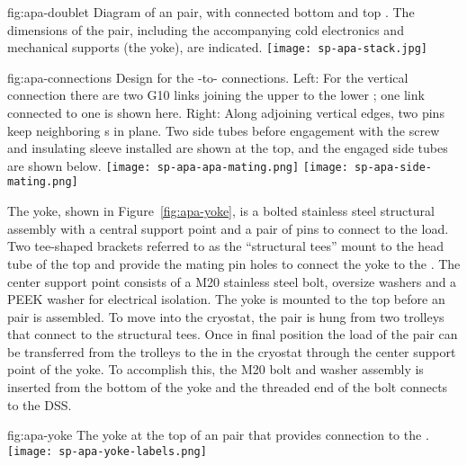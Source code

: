 \begin{dunefigure}{fig:apa-doublet}
{Diagram of an  pair, with connected bottom and top . The dimensions of the  pair, including the accompanying cold electronics and mechanical supports (the yoke), are indicated.}
\texttt{[image: sp-apa-stack.jpg]} 
\end{dunefigure}

\begin{dunefigure}{fig:apa-connections}
{Design for the -to- connections.  Left: For the vertical connection there are two G10 links joining the upper  to the lower ; one link connected to one  is shown here.  Right: Along adjoining vertical edges, two pins keep neighboring s in plane. Two side tubes before engagement with the screw and insulating sleeve installed are shown at the top, and the engaged side tubes are shown below.   }  
\texttt{[image: sp-apa-apa-mating.png]} \qquad
\texttt{[image: sp-apa-side-mating.png]}
\end{dunefigure}

The  yoke, shown in Figure~\ref{fig:apa-yoke}, is a bolted stainless steel structural assembly with a central support point and a pair of pins to connect to the load.  Two tee-shaped brackets referred to as the ``structural tees'' mount to the head tube of the top  and provide the mating pin holes to connect the yoke to the .  The center support point consists of a M20 stainless steel bolt, oversize washers and a PEEK washer for electrical isolation.   The yoke is mounted to the top  before an  pair %
is assembled.  To move into the cryostat, the pair %
is hung from two trolleys that connect to the structural tees. Once in final position the load of the  pair %
can be transferred from the trolleys to the  in the cryostat through the center support point of the yoke.  To accomplish this, the M20 bolt and washer assembly is inserted from the bottom of the yoke and the threaded end of the bolt connects to the DSS.

\begin{dunefigure}{fig:apa-yoke} %
{The yoke at the top of an  pair %
that provides connection to the .}
\texttt{[image: sp-apa-yoke-labels.png]} 
\end{dunefigure}

